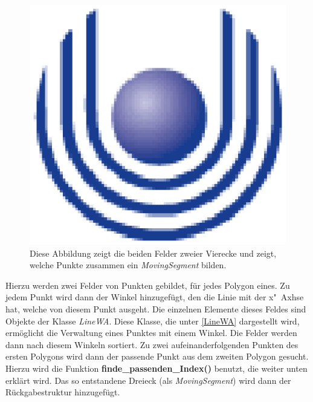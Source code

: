 \begin{figure}
	\centering
	\includegraphics{feu_logo2.eps}
	\caption[Tabellendarstellung des ,,rotating Plane'']{Diese Abbildung zeigt die beiden Felder zweier Vierecke und zeigt, welche Punkte zusammen ein \textit{MovingSegment} bilden.}
	\label{fig:RotatinPane}
\end{figure}


Hierzu werden zwei Felder von Punkten gebildet, für jedes Polygon eines. Zu jedem Punkt wird dann der Winkel hinzugefügt, den die Linie mit der x"~Axhse hat, welche von diesem Punkt ausgeht. Die einzelnen Elemente dieses Feldes sind Objekte der Klasse \textit{LineWA}. Diese Klasse, die unter \vref{LineWA} dargestellt wird, ermöglicht die Verwaltung eines Punktes mit einem Winkel.  Die Felder werden dann nach diesem Winkeln sortiert. Zu zwei aufeinanderfolgenden Punkten des ersten Polygons wird dann der passende Punkt aus dem zweiten Polygon gesucht. Hierzu wird die Funktion \textbf{finde\_passenden\_Index()} benutzt, die weiter unten erklärt wird. Das so entstandene Dreieck (als \textit{MovingSegment}) wird dann der Rückgabestruktur hinzugefügt.

